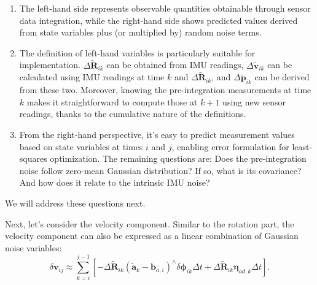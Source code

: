 \begin{enumerate}
	\item The left-hand side represents observable quantities obtainable through sensor data integration, while the right-hand side shows predicted values derived from state variables plus (or multiplied by) random noise terms.
	
	\item The definition of left-hand variables is particularly suitable for implementation. $\Delta \tilde{\mathbf{R}}_{ik}$ can be obtained from IMU readings, $\Delta \tilde{\mathbf{v}}_{ik}$ can be calculated using IMU readings at time $k$ and $\Delta \tilde{\mathbf{R}}_{ik}$, and $\Delta \tilde{\mathbf{p}}_{ik}$ can be derived from these two. Moreover, knowing the pre-integration measurements at time $k$ makes it straightforward to compute those at $k+1$ using new sensor readings, thanks to the cumulative nature of the definitions.
	
	\item From the right-hand perspective, it's easy to predict measurement values based on state variables at times $i$ and $j$, enabling error formulation for least-squares optimization. The remaining questions are: Does the pre-integration noise follow zero-mean Gaussian distribution? If so, what is its covariance? And how does it relate to the intrinsic IMU noise?
\end{enumerate}

We will address these questions next.

Next, let's consider the velocity component. Similar to the rotation part, the velocity component can also be expressed as a linear combination of Gaussian noise variables:
\begin{equation}\label{key}
	\delta \mathbf{v}_{ij} \approx \sum_{k=i}^{j-1} \left[ -\Delta \tilde{\mathbf{R}}_{ik}(\tilde{\mathbf{a}}_k 
	-\mathbf{b}_{a,i})^\wedge \delta \boldsymbol{\phi}_{ik} \Delta t + \Delta \tilde{\mathbf{R}}_{ik} 
	\boldsymbol{\eta}_{ad,k} \Delta t \right].
\end{equation}

